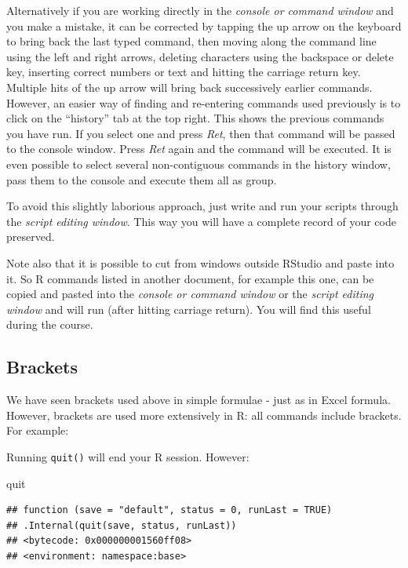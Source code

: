 \documentclass[
]{book}
\makeatletter
\newenvironment{Shaded}{\begin{snugshade}}{\end{snugshade}}
\newcommand{\NormalTok}[1]{#1}
\newenvironment{kframe}{%
\medskip{}
\setlength{\fboxsep}{.8em}
 \def\at@end@of@kframe{}%
 \ifinner\ifhmode%
  \def\at@end@of@kframe{\end{minipage}}%
  \begin{minipage}{\columnwidth}%
 \fi\fi%
 \def\FrameCommand##1{\hskip\@totalleftmargin \hskip-\fboxsep
 \colorbox{shadecolor}{##1}\hskip-\fboxsep
     \hskip-\linewidth \hskip-\@totalleftmargin \hskip\columnwidth}%
 \MakeFramed {\advance\hsize-\width
   \@totalleftmargin\z@ \linewidth\hsize
   \@setminipage}}%
 {\par\unskip\endMakeFramed%
 \at@end@of@kframe}
\newenvironment{rmdblock}[1]
  {
  \begin{itemize}
  \renewcommand{\labelitemi}{
    \raisebox{-.7\height}[0pt][0pt]{
      {\setkeys{Gin}{width=3em,keepaspectratio}\texttt{[image: images/\#1]}}
    }
  }
  \setlength{\fboxsep}{1em}
  \begin{kframe}
  \item
  }
  {
  \end{kframe}
  \end{itemize}
  }
\newenvironment{rmdnote}
  {\begin{rmdblock}{note}}
  {\end{rmdblock}}
\makeatother
\begin{document}
Alternatively if you are working directly in the \emph{console or command window} and you make a mistake, it can be corrected by tapping the up arrow on the keyboard to bring back the last typed command, then moving along the command line using the left and right arrows, deleting characters using the backspace or delete key, inserting correct numbers or text and hitting the carriage return key. Multiple hits of the up arrow will bring back successively earlier commands. However, an easier way of finding and re-entering commands used previously is to click on the ``history'' tab at the top right. This shows the previous commands you have run. If you select one and press \emph{Ret}, then that command will be passed to the console window. Press \emph{Ret} again and the command will be executed. It is even possible to select several non-contiguous commands in the history window, pass them to the console and execute them all as group.

To avoid this slightly laborious approach, just write and run your scripts through the \emph{script editing window}. This way you will have a complete record of your code preserved.

\begin{rmdnote}
Note also that it is possible to cut from windows outside RStudio and paste into it. So R commands listed in another document, for example this one, can be copied and pasted into the \emph{console or command window} or the \emph{script editing window} and will run (after hitting carriage return). You will find this useful during the course.
\end{rmdnote}

\hypertarget{brackets}{%
\subsection{Brackets}\label{brackets}}

We have seen brackets used above in simple formulae - just as in Excel formula. However, brackets are used more extensively in R: all commands include brackets. For example:

Running \texttt{quit()} will end your R session. However:

\begin{Shaded}
\begin{Highlighting}[]
\NormalTok{quit}
\end{Highlighting}
\end{Shaded}

\begin{verbatim}
## function (save = "default", status = 0, runLast = TRUE) 
## .Internal(quit(save, status, runLast))
## <bytecode: 0x000000001560ff08>
## <environment: namespace:base>
\end{verbatim}
\end{document}
